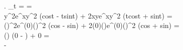 \left.  \right\rvert_{t = } =\\

y^2e^{xy^2} (cost - tsint) +
2xye^{xy^2} (tcost + sint) =\\

\left(\right)^2e^{(0)()^2}
\left(cos - sin\right) +
2(0)\left(\right)e^{(0)()^2}
\left(cos + sin\right) =\\

\left(\right)
\left(0 - \right) +
0 =\\
-
